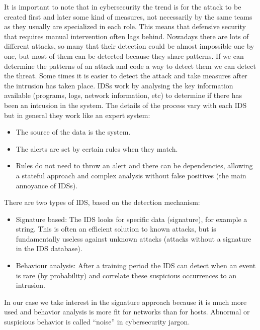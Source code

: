 \linej
\linej
It is important to note that in cybersecurity the trend is for the attack to be created first and later some kind of measures, not necessarily by the same teams as they usually are specialized in each role. This means that defensive security that requires manual intervention often lags behind.
\linej
Nowadays there are lots of different attacks, so many that their detection could be almost impossible one by one, but most of them can be detected because they share patterns. If we can determine the patterns of an attack and code a way to detect them we can detect the threat. Some times it is easier to detect the attack and take measures after the intrusion has taken place.
\linej
\linej
IDSs work by analysing the key information available (programs, logs, network information, etc) to determine if there has been an intrusion in the system. The details of the process vary with each IDS but in general they work like an expert system:
\begin{itemize}
	\item The source of the data is the system.
	\item The alerts are set by certain rules when they match.
	\item Rules do not need to throw an alert and there can be dependencies, allowing a stateful approach and complex analysis without false positives (the main annoyance of IDSs).
\end{itemize}

\linej
There are two types of IDS, based on the detection mechanism:
\begin{itemize}
	\item Signature based: The IDS looks for specific data (signature), for example a string. This is often an efficient solution to known attacks, but is fundamentally useless against unknown attacks (attacks without a signature in the IDS database).
	\item Behaviour analysis: After a training period the IDS can detect when an event is rare (by probability) and correlate these suspicious occurrences to an intrusion.
\end{itemize}
In our case we take interest in the signature approach because it is much more used and behavior analysis is more fit for networks than for hosts.
Abnormal or suspicious behavior is called ``noise'' in cybersecurity jargon.

